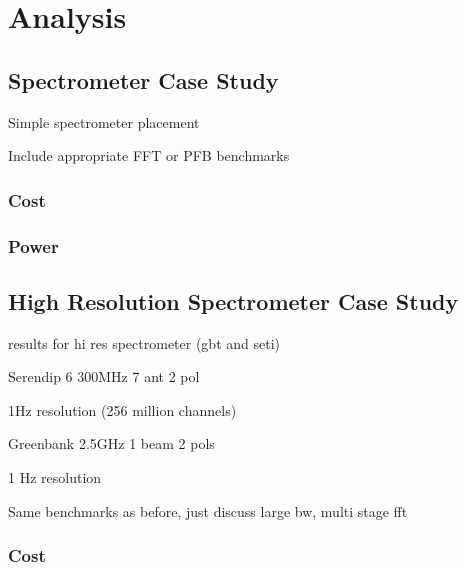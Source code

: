 \chapter{Analysis} \label{Analysis}








\section{Spectrometer Case Study}
Simple spectrometer placement

Include appropriate FFT or PFB benchmarks
\subsection{Cost}
\subsection{Power}

\section{High Resolution Spectrometer Case Study}
results for hi res spectrometer (gbt and seti)

Serendip 6 300MHz 7 ant 2 pol

1Hz resolution (256 million channels)

Greenbank 2.5GHz 1 beam 2 pols

1 Hz resolution

Same benchmarks as before, just discuss large bw, multi stage fft
\subsection{Cost}
